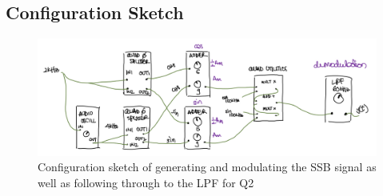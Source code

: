 \documentclass[11pt]{article}
\begin{document}
\subsection*{Configuration Sketch}
\begin{figure}[H]
    \centering
    \includegraphics[width=14cm]{W3Q1_2Config.jpeg}
    \caption{Configuration sketch of generating and modulating the SSB signal as well as following through to the LPF for Q2}
    \label{fig:W3Q1_2Config}
\end{figure}

\newpage
\end{document}
